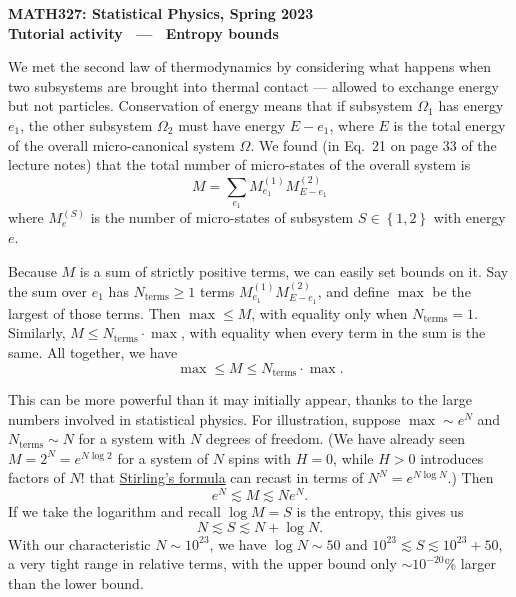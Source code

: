 \documentclass[12 pt]{article} %
\newcommand{\Om}{\ensuremath{\Omega} }
\begin{document}
\newcommand{\thisunit}{MATH327 Tutorial (Entropy)}
\newcommand{\moddate}{Last modified 1 Mar.~2023}
\begin{center}
  {\Large \textbf{MATH327: Statistical Physics, Spring 2023}} \\[12 pt]
  {\Large \textbf{Tutorial activity \ --- \ Entropy bounds}} \\[24 pt]
\end{center}

We met the second law of thermodynamics by considering what happens when two subsystems are brought into thermal contact --- allowed to exchange energy but not particles.
Conservation of energy means that if subsystem $\Om_1$ has energy $e_1$, the other subsystem $\Om_2$ must have energy $E - e_1$, where $E$ is the total energy of the overall micro-canonical system $\Om$.
We found (in Eq.~21 on page 33 of the lecture notes) that the total number of micro-states of the overall system is
\begin{equation*}
  M = \sum_{e_1} M_{e_1}^{(1)} M_{E - e_1}^{(2)}
\end{equation*}
where $M_e^{(S)}$ is the number of micro-states of subsystem $S \in \left\{1, 2\right\}$ with energy $e$.

Because $M$ is a sum of strictly positive terms, we can easily set bounds on it.
Say the sum over $e_1$ has $N_{\text{terms}} \geq 1$ terms $M_{e_1}^{(1)} M_{E - e_1}^{(2)}$, and define $\max$ be the largest of those terms.
Then $\max \leq M$, with equality only when $N_{\text{terms}} = 1$.
Similarly, $M \leq N_{\text{terms}} \cdot \max$, with equality when every term in the sum is the same.
All together, we have
\begin{equation*}
  \max \leq M \leq N_{\text{terms}} \cdot \max.
\end{equation*}

This can be more powerful than it may initially appear, thanks to the large numbers involved in statistical physics.
For illustration, suppose $\max \sim e^N$ and $N_{\text{terms}} \sim N$ for a system with $N$ degrees of freedom.
(We have already seen $M = 2^N = e^{N\log 2}$ for a system of $N$ spins with $H = 0$, while $H > 0$ introduces factors of $N!$ that \href{https://en.wikipedia.org/wiki/Stirling's_approximation}{Stirling's formula} can recast in terms of $N^N = e^{N\log N}$.)
Then
\begin{equation*}
  e^N \lesssim M \lesssim N e^N.
\end{equation*}
If we take the logarithm and recall $\log M = S$ is the entropy, this gives us
\begin{equation*}
  N \lesssim S \lesssim N + \log N.
\end{equation*}
With our characteristic $N \sim 10^{23}$, we have $\log N \sim 50$ and $10^{23} \lesssim S \lesssim 10^{23} + 50$, a very tight range in relative terms, with the upper bound only $\sim$$10^{-20}\%$ larger than the lower bound.
\end{document}
